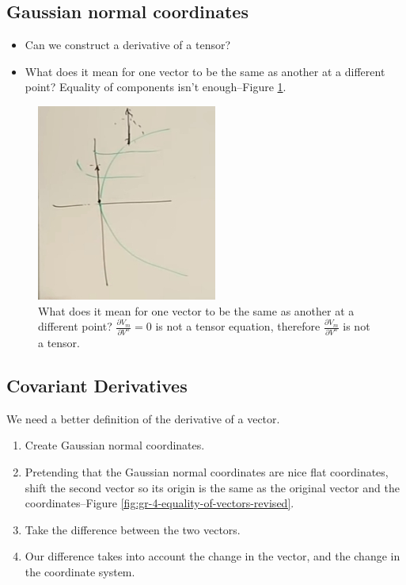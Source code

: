 \documentclass[]{article}
\begin{document}
\subsection{Gaussian normal coordinates}

\begin{itemize}
	\item Can we construct a derivative of a tensor?
	\item What does it mean for one vector to be the same as another at a different point? Equality of components isn't enough--Figure \ref{fig:gr-4-equality-of-vectors}. 
\end{itemize}

\begin{figure}[H]
	\begin{center}
		\caption[What does it mean for one vector to be the same as another at a different point?]{What does it mean for one vector to be the same as another at a different point? $\frac{\partial V_m}{\partial V^n}=0$ is not a tensor equation, therefore $\frac{\partial V_m}{\partial V^n}$ is not a tensor.}\label{fig:gr-4-equality-of-vectors}
		\includegraphics{gr-4-equality-of-vectors}
	\end{center}
\end{figure}

\subsection{Covariant Derivatives}

We need a better definition of the derivative of a vector.

\begin{enumerate}
	\item Create Gaussian normal coordinates.
	\item Pretending that the Gaussian normal coordinates are nice flat coordinates, shift the second vector so its origin is the same as the original vector and the coordinates--Figure \ref{fig:gr-4-equality-of-vectors-revised}.
	\item Take the difference between the two vectors.
	\item Our difference takes into account the change in the vector, and the change in the coordinate system.
\end{enumerate}
\end{document}
